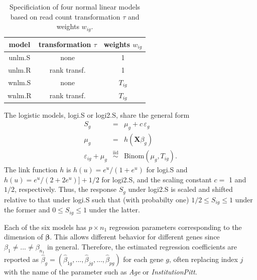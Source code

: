 \documentclass[letterpaper]{article}
\begin{document}
\begin{table}
\begin{center}
\begin{tabular}{c|cc}
model & transformation \(\tau\) & weights \(w_{ig}\) \\
\hline
unlm.S & none & 1 \\
unlm.R & rank transf. & 1 \\
wnlm.S & none & \(T_{ig}\) \\
wnlm.R & rank transf. & \(T_{ig}\) \\
\end{tabular}
\end{center}
\caption{Specificiation of four normal linear models based on read count
transformation \(\tau\) and weights \(w_{ig}\).}
\label{tab:nlm}
\end{table}

The logistic models, logi.S or logi2.S, share the general form
\begin{eqnarray}
S_g &=& \mu_g + c\, \varepsilon_g
\label{eq:logi-general}
\\
\mu_g &=& h(\mathbf{X} \beta_g) \\
\varepsilon_{ig} + \mu_g &\overset{\mathrm{iid}}{\sim}& \mathrm{Binom}(\mu_g, T_{ig}).
\label{eq:binom-error}
\end{eqnarray}
The link function \(h\) is \(h(u) = e^u / (1 + e^u)\) for logi.S and \(h(u) =
e^u / (2 + 2e^u)] + 1/2\) for logi2.S, and the scaling constant \(c=\) 1
 and \(1/2\), respectively.  Thus, the response \(S_g\) under logi2.S is scaled and shifted relative to
that under logi.S such that (with probabilty one) \(1/2\le S_{ig}\le 1\) under the former and
\(0\le S_{ig}\le 1\) under the latter.

Each of the six models has \(p\times n_1\) regression parameters corresponding to the
dimension of \(\boldsymbol{\beta}\).  This allows different behavior for
different genes since \(\beta_1\neq ...\neq\beta_{n_1}\) in general.
Therefore, the estimated regression coefficients are reported as \(\hat{\beta}_g =
(\hat{\beta}_{1g},...,\hat{\beta}_{jg},...,\hat{\beta}_{pg})\) for each gene \(g\), often
replacing index \(j\) with the name of the parameter such as \emph{Age} or
\emph{InstitutionPitt}.
\end{document}
